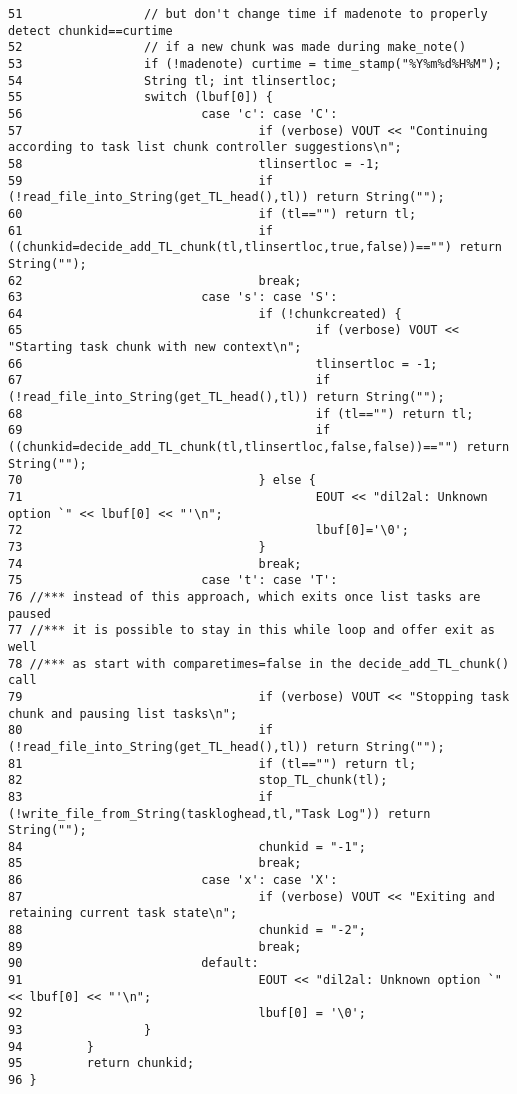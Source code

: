 \begin{verbatim}
51                 // but don't change time if madenote to properly detect chunkid==curtime
52                 // if a new chunk was made during make_note()
53                 if (!madenote) curtime = time_stamp("%Y%m%d%H%M");
54                 String tl; int tlinsertloc;
55                 switch (lbuf[0]) {
56                         case 'c': case 'C':
57                                 if (verbose) VOUT << "Continuing according to task list chunk controller suggestions\n";
58                                 tlinsertloc = -1;
59                                 if (!read_file_into_String(get_TL_head(),tl)) return String("");
60                                 if (tl=="") return tl;
61                                 if ((chunkid=decide_add_TL_chunk(tl,tlinsertloc,true,false))=="") return String("");
62                                 break;
63                         case 's': case 'S':
64                                 if (!chunkcreated) {
65                                         if (verbose) VOUT << "Starting task chunk with new context\n";
66                                         tlinsertloc = -1;
67                                         if (!read_file_into_String(get_TL_head(),tl)) return String("");
68                                         if (tl=="") return tl;
69                                         if ((chunkid=decide_add_TL_chunk(tl,tlinsertloc,false,false))=="") return String("");
70                                 } else {
71                                         EOUT << "dil2al: Unknown option `" << lbuf[0] << "'\n";
72                                         lbuf[0]='\0';
73                                 }
74                                 break;
75                         case 't': case 'T':
76 //*** instead of this approach, which exits once list tasks are paused
77 //*** it is possible to stay in this while loop and offer exit as well
78 //*** as start with comparetimes=false in the decide_add_TL_chunk() call
79                                 if (verbose) VOUT << "Stopping task chunk and pausing list tasks\n";
80                                 if (!read_file_into_String(get_TL_head(),tl)) return String("");
81                                 if (tl=="") return tl;
82                                 stop_TL_chunk(tl);
83                                 if (!write_file_from_String(taskloghead,tl,"Task Log")) return String("");
84                                 chunkid = "-1";
85                                 break;
86                         case 'x': case 'X':
87                                 if (verbose) VOUT << "Exiting and retaining current task state\n";
88                                 chunkid = "-2";
89                                 break;
90                         default:
91                                 EOUT << "dil2al: Unknown option `" << lbuf[0] << "'\n";
92                                 lbuf[0] = '\0';
93                 }
94         }
95         return chunkid;
96 }
\end{verbatim}\normalsize 
{}
